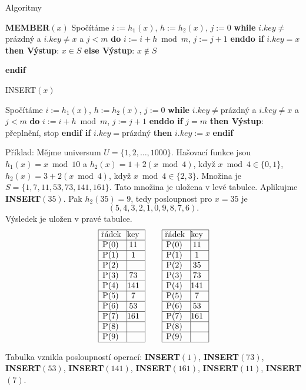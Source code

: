 \documentclass[a4paper,12pt]{article}
\begin{document}
\subhead
Algoritmy
\endsubhead
\bigskip

{\bf MEMBER$(x)$}\newline 
Spočítáme $i:=h_1(x)$, $h:=h_2(x)$, $j:=0$\newline 
{\bf while} $i.key\ne$prázdný a $i.key\ne x$ a $j<m$ {\bf do} $
i:=i+h\bmod m$, $j:=j+1$ {\bf enddo\newline 
if} $i.key=x$ {\bf then Výstup}: $x\in S$ {\bf else Výstup}: $
x\notin S$ {\bf endif
\bigskip

INSERT$(x)$}\newline 
Spočítáme $i:=h_1(x)$, $h:=h_2(x)$, $j:=0$\newline 
{\bf while} $i.key\ne$prázdný a $i.key\ne x$ a $j<m$ {\bf do} $
i:=i+h\bmod m$, $j:=j+1$ {\bf enddo\newline 
if} $j=m$ {\bf then Výstup}: přeplnění, stop {\bf endif\newline 
if} $i.key=$prázdný {\bf then} $i.key:=x$ {\bf endif}
\bigskip

Příklad: Mějme universum $U=\{1,2,\dots,1000
\}$. 
Hašovací funkce jsou 
$h_1(x)=x\bmod10$ a $h_2(x)=1+2(x\bmod4)$, když 
$x\bmod4\in \{0,1\}$, $h_2(x)=3+2(x\bmod4)$, když $x\bmod4\in 
\{2,3\}$. 
Množina je  $S=\{1,7,11,53,73,141,161\}$. Tato množina je uložena v 
levé tabulce. Aplikujme {\bf INSERT$(35)$}. Pak $h_2(35)=9$, tedy 
posloupnost pro $x=35$ je 
$$(5,4,3,2,1,0,9,8,7,6).$$
Výsledek je uložen v pravé tabulce. 
$$\vbox {\hbox{\vtop{\offinterlineskip\halign{\strut\vrule\ # & \vrule\hfil# \hfil\vrule\cr\noalign{\hrule}řádek & key \hfil\cr\noalign{\hrule}P(0) & 11 \cr\noalign{\hrule}P(1) & 1 \cr\noalign{\hrule}P(2) & \hfill \cr\noalign{\hrule}P(3) & 73 \cr\noalign{\hrule}P(4) & 141 \cr\noalign{\hrule}P(5) & 7 \cr\noalign{\hrule}P(6) & 53 \cr\noalign{\hrule}P(7) & 161 \cr\noalign{\hrule}P(8) & \hfill\cr\noalign{\hrule}P(9) & \hfill \cr\noalign{\hrule}}}\qquad\vtop{\offinterlineskip\halign {\strut\vrule\ # & \vrule \hfil # \hfil \vrule\cr\noalign{\hrule}řádek & key \hfil \cr\noalign{\hrule}P(0) & 11 \cr\noalign{\hrule}P(1) & 1 \cr\noalign{\hrule}P(2) & 35 \cr\noalign{\hrule}P(3) & 73 \cr\noalign{\hrule}P(4) & 141 \cr\noalign{\hrule}P(5) & 7 \cr\noalign{\hrule}P(6) & 53 \cr\noalign{\hrule}P(7) & 161 \cr\noalign{\hrule}P(8) & \hfill \cr\noalign{\hrule}P(9) & \hfill \cr\noalign{\hrule}}}}}$$

Tabulka vznikla posloupností operací:\newline 
{\bf INSERT$(1)$}, {\bf INSERT$(73)$}, {\bf INSERT$(53)$}, 
{\bf INSERT$(141)$}, {\bf INSERT$(161)$},\newline 
{\bf INSERT$(11)$}, {\bf INSERT$(7)$}. 
\end{document}
